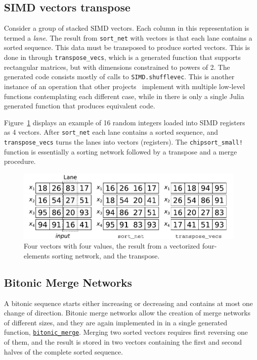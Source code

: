 \documentclass{juliacon}
\begin{document}
\subsection{SIMD vectors transpose}
%
Consider a group of stacked SIMD vectors. Each column in this representation is termed a {\em lane}. The result from {\tt sort\_net} with vectors is that each lane contains a sorted sequence. This data must be transposed to produce sorted vectors. This is done in \chipsort through {\tt transpose\_vecs}, which is a generated function that supports rectangular matrices, but with dimensions constrained to powers of 2. The generated code consists mostly of calls to {\tt SIMD.shufflevec}. This is another instance of an operation that other projects~\cite{DBLP:journals/pvldb/BalkesenATO13,ultrasort} implement with multiple low-level functions contemplating each different case, while in \chipsort there is only a single Julia generated function that produces equivalent code.

Figure~\ref{fig:transpose-vecs} displays an example of 16 random integers loaded into SIMD registers as 4 vectors. After {\tt sort\_net} each lane contains a sorted sequence, and {\tt transpose\_vecs} turns the lanes into vectors (registers). The {\tt chipsort\_small!} function is essentially a sorting network followed by a transpose and a merge procedure.

\begin{figure}[htb]
\centerline{\includegraphics[width=0.99\linewidth]{fig/regs.pdf}}
\caption{Four vectors with four values, the result from a vectorized four-elements sorting network, and the transpose.}
\label{fig:transpose-vecs}
\end{figure}

\subsection{Bitonic Merge Networks}
%
A bitonic sequence starts either increasing or decreasing and contains at most one change of direction. Bitonic merge networks allow the creation of merge networks of different sizes, and they are again implemented in \chipsort in a single generated function, \href{https://github.com/nlw0/ChipSort.jl/blob/10eb1a962e720aee2bf8733c832468b51a782c1a/src/bitonic-merge-network.jl#L12}{\tt bitonic\_merge}. Merging two sorted vectors requires first reversing one of them, and the result is stored in two vectors containing the first and second halves of the complete sorted sequence.
\end{document}
